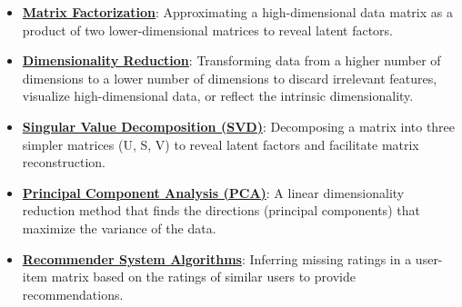 \documentclass{article}%
\begin{document}
\begin{itemize}[leftmargin=*]%
\item \href{https://purdue.brightspace.com/d2l/common/assets/pdfjs-d2l-dist/1.0.14-legacy/web/viewer.html?file=\%2Fcontent\%2Fenforced\%2F1095467-wl.202510.CS.24300.001\%2F11L2-svd-pca-recommender.pdf\%3Fou\%3D1095467\&lang=en-us\&container=d2l-fileviewer-rendered-pdf\&fullscreen=d2l-fileviewer-rendered-pdf-dialog\&height=667#page=13}{\textbf{Matrix Factorization}}: Approximating a high-dimensional data matrix as a product of two lower-dimensional matrices to reveal latent factors.%
\item \href{https://purdue.brightspace.com/d2l/common/assets/pdfjs-d2l-dist/1.0.14-legacy/web/viewer.html?file=\%2Fcontent\%2Fenforced\%2F1095467-wl.202510.CS.24300.001\%2F11L2-svd-pca-recommender.pdf\%3Fou\%3D1095467\&lang=en-us\&container=d2l-fileviewer-rendered-pdf\&fullscreen=d2l-fileviewer-rendered-pdf-dialog\&height=667#page=8}{\textbf{Dimensionality Reduction}}: Transforming data from a higher number of dimensions to a lower number of dimensions to discard irrelevant features, visualize high-dimensional data, or reflect the intrinsic dimensionality.%
\item \href{https://purdue.brightspace.com/d2l/common/assets/pdfjs-d2l-dist/1.0.14-legacy/web/viewer.html?file=\%2Fcontent\%2Fenforced\%2F1095467-wl.202510.CS.24300.001\%2F11L2-svd-pca-recommender.pdf\%3Fou\%3D1095467\&lang=en-us\&container=d2l-fileviewer-rendered-pdf\&fullscreen=d2l-fileviewer-rendered-pdf-dialog\&height=667#page=10}{\textbf{Singular Value Decomposition (SVD)}}: Decomposing a matrix into three simpler matrices (U, S, V) to reveal latent factors and facilitate matrix reconstruction.%
\item \href{https://purdue.brightspace.com/d2l/common/assets/pdfjs-d2l-dist/1.0.14-legacy/web/viewer.html?file=\%2Fcontent\%2Fenforced\%2F1095467-wl.202510.CS.24300.001\%2F11L2-svd-pca-recommender.pdf\%3Fou\%3D1095467\&lang=en-us\&container=d2l-fileviewer-rendered-pdf\&fullscreen=d2l-fileviewer-rendered-pdf-dialog\&height=667#page=15}{\textbf{Principal Component Analysis (PCA)}}: A linear dimensionality reduction method that finds the directions (principal components) that maximize the variance of the data.%
\item \href{https://purdue.brightspace.com/d2l/common/assets/pdfjs-d2l-dist/1.0.14-legacy/web/viewer.html?file=\%2Fcontent\%2Fenforced\%2F1095467-wl.202510.CS.24300.001\%2F11L2-svd-pca-recommender.pdf\%3Fou\%3D1095467\&lang=en-us\&container=d2l-fileviewer-rendered-pdf\&fullscreen=d2l-fileviewer-rendered-pdf-dialog\&height=667#page=31}{\textbf{Recommender System Algorithms}}: Inferring missing ratings in a user-item matrix based on the ratings of similar users to provide recommendations.%

\end{itemize}
\end{document}
